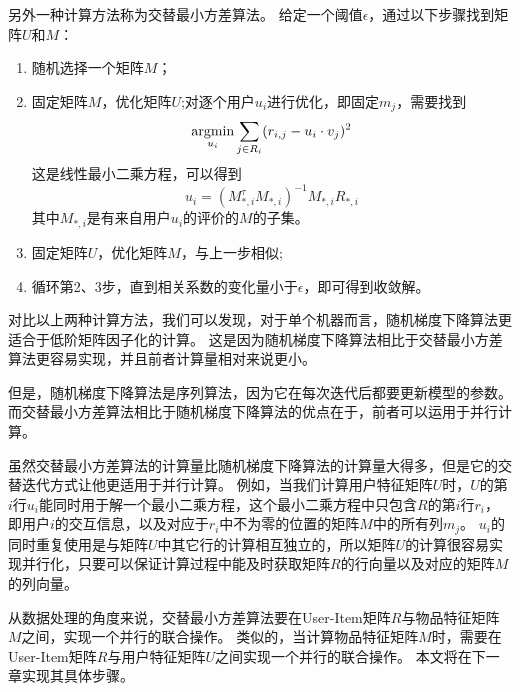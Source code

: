 另外一种计算方法称为交替最小方差算法。
给定一个阈值$\epsilon$，通过以下步骤找到矩阵$U$和$M$：
\begin{enumerate}
	\item 随机选择一个矩阵$M$；
	\item 固定矩阵$M$，优化矩阵$U$;对逐个用户$u_i$进行优化，即固定$m_j$，需要找到
	\[
	\mathop{\operatorname*{argmin}}_{u_i} \sum_{j\in R_i}(r_{i,j}-u_i\cdot v_j)^2
	\]
	这是线性最小二乘方程，可以得到
	\[
	u_i=(M_{*,i}^{\tau}M_{*,i})^{-1}M_{*,i}R_{*,i}
	\]
	其中$M_{*,i}$是有来自用户$u_i$的评价的$M$的子集。
	\item 固定矩阵$U$，优化矩阵$M$，与上一步相似;
	\item 循环第2、3步，直到相关系数的变化量小于$\epsilon$，即可得到收敛解。
\end{enumerate}

对比以上两种计算方法，我们可以发现，对于单个机器而言，随机梯度下降算法更适合于低阶矩阵因子化的计算。
这是因为随机梯度下降算法相比于交替最小方差算法更容易实现，并且前者计算量相对来说更小。

但是，随机梯度下降算法是序列算法，因为它在每次迭代后都要更新模型的参数。
而交替最小方差算法相比于随机梯度下降算法的优点在于，前者可以运用于并行计算。

虽然交替最小方差算法的计算量比随机梯度下降算法的计算量大得多，但是它的交替迭代方式让他更适用于并行计算。
例如，当我们计算用户特征矩阵$U$时，$U$的第$i$行$u_i$能同时用于解一个最小二乘方程，这个最小二乘方程中只包含$R$的第$i$行$r_i$，即用户$i$的交互信息，以及对应于$r_i$中不为零的位置的矩阵$M$中的所有列$m_j$。
$u_i$的同时重复使用是与矩阵$U$中其它行的计算相互独立的，所以矩阵$U$的计算很容易实现并行化，只要可以保证计算过程中能及时获取矩阵$R$的行向量以及对应的矩阵$M$的列向量。

从数据处理的角度来说，交替最小方差算法要在User-Item矩阵$R$与物品特征矩阵$M$之间，实现一个并行的联合操作。
类似的，当计算物品特征矩阵$M$时，需要在User-Item矩阵$R$与用户特征矩阵$U$之间实现一个并行的联合操作。
本文将在下一章实现其具体步骤。








